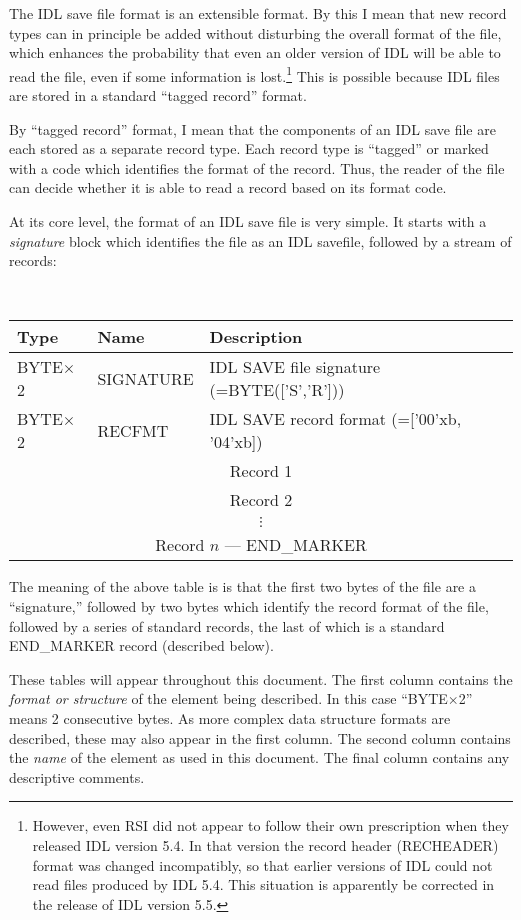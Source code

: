 \documentclass[12pt]{article}
\def\recb#1#2{\bigskip\begin{center}\par\noindent{Format: \bf #1}\qquad{\tt #2}\\[.05in]%
\begin{tabular}{|p{1.0in}|l|p{3.5in}|}\hline
{\bf Type} & {\bf Name} & {\bf Description}\\\hline}
\def\rece{\end{tabular}\end{center}\medskip}
\def\recl#1#2#3{{#2} & {#1} & {#3}\\\hline}
\def\tx{$\times$}
\begin{document}
The IDL save file format is an extensible format.  By this I mean that
new record types can in principle be added without disturbing the
overall format of the file, which enhances the probability that even
an older version of IDL will be able to read the file, even if some
information is lost.\footnote{However, even RSI did not appear to
follow their own prescription when they released IDL version 5.4.  In
that version the record header (RECHEADER) format was changed
incompatibly, so that earlier versions of IDL could not read files
produced by IDL 5.4.  This situation is apparently be corrected in
the release of IDL version 5.5.}  This is possible because IDL files
are stored in a standard ``tagged record'' format.

By ``tagged record'' format, I mean that the components of an IDL save
file are each stored as a separate record type.  Each record type is
``tagged'' or marked with a code which identifies the format of the
record.  Thus, the reader of the file can decide whether it is able to
read a record based on its format code.  

At its core level, the format of an IDL save file is very simple.  It
starts with a {\it signature} block which identifies the file as an
IDL savefile, followed by a stream of records:

\recb{SAVEFMT}{(overall save file format)}
\recl{SIGNATURE}{BYTE\tx 2}{IDL SAVE file signature (=BYTE(['S','R']))}
\recl{RECFMT}{BYTE\tx 2}{IDL SAVE record format (=['00'xb, '04'xb])}
\multicolumn{3}{|c|}{Record 1}\\\hline
\multicolumn{3}{|c|}{Record 2}\\\hline
\multicolumn{3}{|c|}{$\vdots$}\\\hline
\multicolumn{3}{|c|}{Record $n$ --- END\_MARKER}\\\hline
\rece

The meaning of the above table is is that the first two bytes of the
file are a ``signature,'' followed by two bytes which identify the
record format of the file, followed by a series of standard records,
the last of which is a standard END\_MARKER record (described below).

These tables will appear throughout this document.  The first column
contains the {\it format or structure} of the element being described.
In this case ``BYTE\tx 2'' means 2 consecutive bytes.  As more complex
data structure formats are described, these may also appear in the
first column.  The second column contains the {\it name} of the
element as used in this document.  The final column contains any
descriptive comments.
\end{document}
